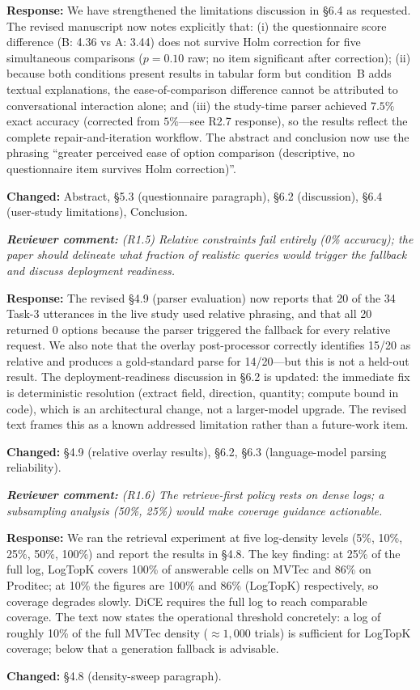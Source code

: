 \documentclass[11pt,a4paper]{article}
\newcommand{\revquote}[1]{\smallskip\noindent\textit{\textbf{Reviewer comment:} #1}\smallskip}
\newcommand{\response}[1]{\noindent\textbf{Response:} #1\par}
\begin{document}
\response{We have strengthened the limitations discussion in \S6.4
as requested. The revised manuscript now notes explicitly that:
(i) the questionnaire score difference (B: 4.36 vs A: 3.44) does not
survive Holm correction for five simultaneous comparisons ($p = 0.10$
raw; no item significant after correction);
(ii) because both conditions present results in tabular form but
condition~B adds textual explanations, the ease-of-comparison
difference cannot be attributed to conversational interaction alone;
and (iii) the study-time parser achieved $7.5\%$ exact accuracy
(corrected from $5\%$---see R2.7 response), so the results reflect
the complete repair-and-iteration workflow. The abstract and conclusion
now use the phrasing ``greater perceived ease of option comparison
(descriptive, no questionnaire item survives Holm correction)''.

\noindent\textbf{Changed:} Abstract, \S5.3 (questionnaire paragraph),
\S6.2 (discussion), \S6.4 (user-study limitations), Conclusion.}

\bigskip

\revquote{(R1.5) Relative constraints fail entirely (0\% accuracy); the paper
should delineate what fraction of realistic queries would trigger the
fallback and discuss deployment readiness.}

\response{The revised \S4.9 (parser evaluation) now reports that
20 of the 34 Task-3 utterances in the live study used relative
phrasing, and that all 20 returned 0 options because the parser
triggered the fallback for every relative request. We also note that
the overlay post-processor correctly identifies 15/20 as relative and
produces a gold-standard parse for 14/20---but this is not a held-out
result. The deployment-readiness discussion in \S6.2 is updated: the
immediate fix is deterministic resolution (extract field, direction,
quantity; compute bound in code), which is an architectural change,
not a larger-model upgrade. The revised text frames this as a known
addressed limitation rather than a future-work item.

\noindent\textbf{Changed:} \S4.9 (relative overlay results), \S6.2,
\S6.3 (language-model parsing reliability).}

\bigskip

\revquote{(R1.6) The retrieve-first policy rests on dense logs; a subsampling
analysis (50\%, 25\%) would make coverage guidance actionable.}

\response{We ran the retrieval experiment at five log-density levels
(5\%, 10\%, 25\%, 50\%, 100\%) and report the results in \S4.8.
The key finding: at 25\% of the full log, LogTopK covers 100\% of
answerable cells on MVTec and 86\% on Proditec; at 10\% the figures
are 100\% and 86\% (LogTopK) respectively, so coverage degrades slowly.
DiCE requires the full log to reach comparable coverage. The text now
states the operational threshold concretely: a log of roughly 10\% of
the full MVTec density ($\approx 1{,}000$ trials) is sufficient for
LogTopK coverage; below that a generation fallback is advisable.

\noindent\textbf{Changed:} \S4.8 (density-sweep paragraph).}
\end{document}

